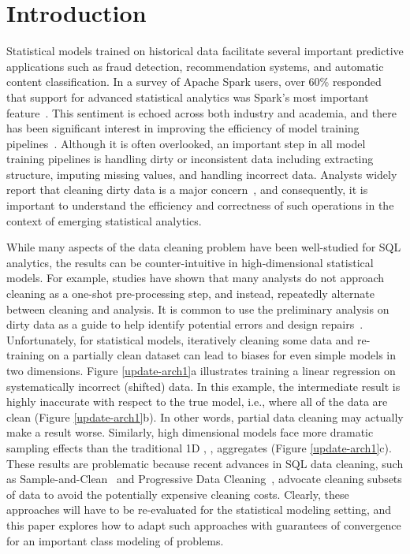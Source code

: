 \section{Introduction}
Statistical models trained on historical data facilitate several important predictive applications such as fraud detection, recommendation systems, and automatic content classification.
In a survey of Apache Spark users, over 60\% responded that support for advanced statistical analytics was Spark's most important feature~\cite{sparksurvey}.
This sentiment is echoed across both industry and academia, and there has been significant interest in improving the efficiency of model training pipelines~\cite{bdas, alexandrov2014stratosphere, crotty2014tupleware, tensor}. 
Although it is often overlooked, an important step in all model training pipelines is handling dirty or inconsistent data including extracting structure, imputing missing values, and handling incorrect data.
Analysts widely report that cleaning dirty data is a major concern~\cite{kandel2012,nytimes}, and consequently, it is important to understand the efficiency and correctness of such operations in the context of emerging statistical analytics.

While many aspects of the data cleaning problem have been well-studied for SQL analytics, the results can be counter-intuitive in high-dimensional statistical models.
For example, studies have shown that many analysts do not approach cleaning as a one-shot pre-processing step, and instead, repeatedly alternate between cleaning and analysis.
It is common to use the preliminary analysis on dirty data as a guide to help identify potential errors and design repairs~\cite{kandel2012}.
Unfortunately, for statistical models, iteratively cleaning some data and re-training on a partially clean dataset can lead to biases for even simple models in two dimensions.
Figure \ref{update-arch1}a illustrates training a linear regression on systematically incorrect (shifted) data.
In this example, the intermediate result is highly inaccurate with respect to the true model, i.e., where all of the data are clean (Figure \ref{update-arch1}b).
In other words, partial data cleaning may actually make a result worse.
Similarly, high dimensional models face more dramatic sampling effects than the traditional 1D  \sumfunc, \countfunc, \avgfunc aggregates (Figure \ref{update-arch1}c).
These results are problematic because recent advances in SQL data cleaning, such as Sample-and-Clean~\cite{wang1999sample} and Progressive Data Cleaning~\cite{altowim2014progressive, papenbrock2015progressive, DBLP:journals/pvldb/YakoutENOI11}, advocate cleaning subsets of data to avoid the potentially expensive cleaning costs.
Clearly, these approaches will have to be re-evaluated for the statistical modeling setting, and this paper explores how to adapt such approaches with guarantees of convergence for an important class modeling of problems. 

